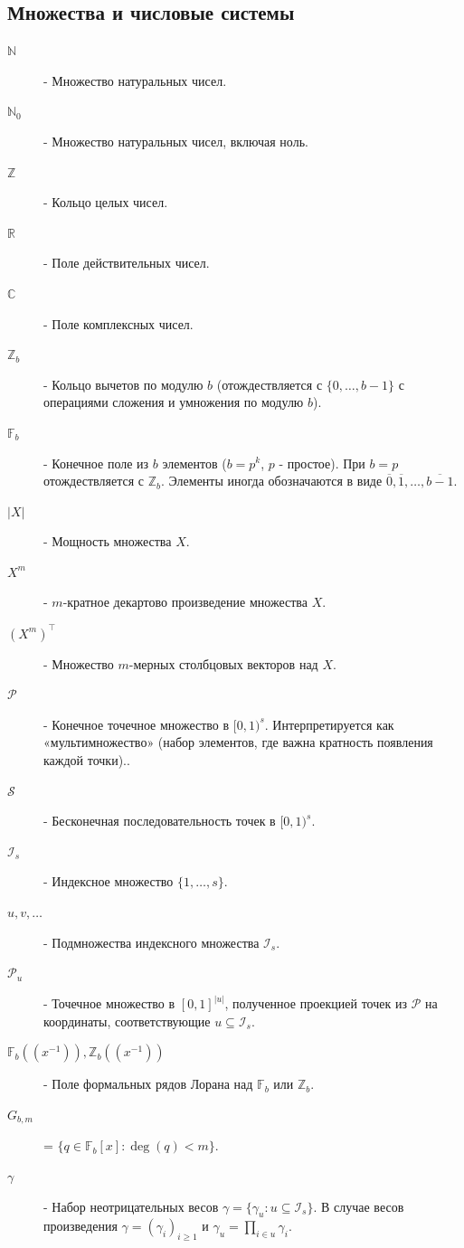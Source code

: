 \documentclass[12pt, a4paper]{article}
\theoremstyle{plain}
\theoremstyle{definition}
\theoremstyle{remark}
\newcommand{\NN}{\mathbb{N}}
\newcommand{\NNz}{\mathbb{N}_0}
\newcommand{\ZZ}{\mathbb{Z}}
\newcommand{\RR}{\mathbb{R}}
\newcommand{\CC}{\mathbb{C}}
\newcommand{\FF}{\mathbb{F}}
\newcommand{\ZZb}{\mathbb{Z}_b}
\newcommand{\II}{[0, 1)}
\newcommand{\PP}{\mathcal{P}}
\newcommand{\ScrS}{\mathcal{S}}
\newcommand{\Is}{\mathcal{I}_s}
\newcommand{\cPu}{\mathcal{P}_u}
\begin{document}
\subsection*{Множества и числовые системы}
\begin{description}
    \item[$\NN$] - Множество натуральных чисел.
    \item[$\NNz$] - Множество натуральных чисел, включая ноль.
    \item[$\ZZ$] - Кольцо целых чисел.
    \item[$\RR$] - Поле действительных чисел.
    \item[$\CC$] - Поле комплексных чисел.
    \item[$\ZZb$] - Кольцо вычетов по модулю $b$ (отождествляется с $\{0, \dots, b-1\}$ с операциями сложения и умножения по модулю $b$).
    \item[$\FF_b$] - Конечное поле из $b$ элементов ($b=p^k$, $p$ - простое). При $b=p$ отождествляется с $\ZZb$. Элементы иногда обозначаются в виде $\overline{0}, \overline{1}, \dots, \overline{b-1}$.
    \item[$|X|$] - Мощность множества $X$.
    \item[$X^m$] - $m$-кратное декартово произведение множества $X$.
    \item[$(X^m)^\top$] - Множество $m$-мерных столбцовых векторов над $X$.
    \item[$\PP$] - Конечное точечное множество в $\II^s$. Интерпретируется как «мультимножество» (набор элементов, где важна кратность появления каждой точки)..
    \item[$\ScrS$] - Бесконечная последовательность точек в $\II^s$.
    \item[$\Is$] - Индексное множество $\{1, \dots, s\}$.
    \item[$u, v, \dots$] - Подмножества индексного множества $\Is$.
    \item[$\cPu$] - Точечное множество в $[0,1]^{|u|}$, полученное проекцией точек из $\PP$ на координаты, соответствующие $u \subseteq \Is$.
    \item[{$\FF_b((x^{-1})), \ZZb((x^{-1}))$}] - Поле формальных рядов Лорана над $\FF_b$ или $\ZZb$.
    \item[$G_{b,m}$] = $\{q \in \FF_b[x] : \deg(q) < m\}$.
    \item[$\gamma$] - Набор неотрицательных весов $\gamma = \{\gamma_u : u \subseteq \Is\}$. В случае весов произведения $\gamma = (\gamma_i)_{i \ge 1}$ и $\gamma_u = \prod_{i \in u} \gamma_i$.
\end{description}
\end{document}

